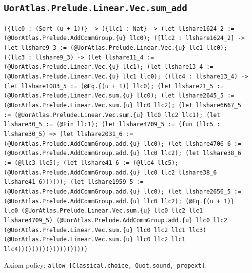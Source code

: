 \documentclass[11pt]{article}
\begin{document}
\subsection*{\texttt{UorAtlas.Prelude.Linear.Vec.sum\_add}}
\noindent\texttt{(\{llc0 : (Sort (u + 1))\} -> (\{llc1 : Nat\} -> (let llshare1624\_2 := (@UorAtlas.Prelude.AddCommGroup.\{u\} llc0); ([llc2 : llshare1624\_2] -> (let llshare9\_3 := (@UorAtlas.Prelude.Linear.Vec.\{u\} llc1 llc0); ((llc3 : llshare9\_3) -> (let llshare11\_4 := (@UorAtlas.Prelude.Linear.Vec.\{u\} llc1); (let llshare13\_4 := (@UorAtlas.Prelude.Linear.Vec.\{u\} llc1 llc0); ((llc4 : llshare13\_4) -> (let llshare1083\_5 := (@Eq.\{(u + 1)\} llc0); (let llshare21\_5 := (@UorAtlas.Prelude.Linear.Vec.sum.\{u\} llc0); (let llshare2645\_5 := (@UorAtlas.Prelude.Linear.Vec.sum.\{u\} llc0 llc2); (let llshare6667\_5 := (@UorAtlas.Prelude.Linear.Vec.sum.\{u\} llc0 llc2 llc1); (let llshare30\_5 := (@Fin llc1); (let llshare4709\_5 := (fun (llc5 : llshare30\_5) => (let llshare2031\_6 := (@UorAtlas.Prelude.AddCommGroup.add.\{u\} llc0); (let llshare4706\_6 := (@UorAtlas.Prelude.AddCommGroup.add.\{u\} llc0 llc2); (let llshare38\_6 := (@llc3 llc5); (let llshare41\_6 := (@llc4 llc5); (@UorAtlas.Prelude.AddCommGroup.add.\{u\} llc0 llc2 llshare38\_6 llshare41\_6)))))); (let llshare1959\_5 := (@UorAtlas.Prelude.AddCommGroup.add.\{u\} llc0); (let llshare2656\_5 := (@UorAtlas.Prelude.AddCommGroup.add.\{u\} llc0 llc2); (@Eq.\{(u + 1)\} llc0 (@UorAtlas.Prelude.Linear.Vec.sum.\{u\} llc0 llc2 llc1 llshare4709\_5) (@UorAtlas.Prelude.AddCommGroup.add.\{u\} llc0 llc2 (@UorAtlas.Prelude.Linear.Vec.sum.\{u\} llc0 llc2 llc1 llc3) (@UorAtlas.Prelude.Linear.Vec.sum.\{u\} llc0 llc2 llc1 llc4))))))))))))))))))))}\par
\noindent Axiom policy: \texttt{allow [Classical.choice, Quot.sound, propext]}.\par
\end{document}
